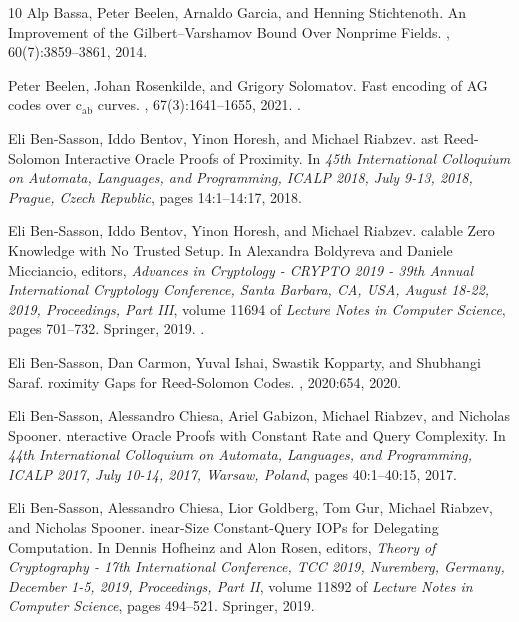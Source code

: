 \begin{thebibliography}{10}
Alp {Bassa}, Peter {Beelen}, Arnaldo {Garcia}, and Henning {Stichtenoth}.
\newblock An {I}mprovement of the {G}ilbert–{V}arshamov {B}ound {O}ver
  {N}onprime {F}ields.
,
  60(7):3859--3861, 2014.

Peter Beelen, Johan Rosenkilde, and Grigory Solomatov.
\newblock Fast encoding of {AG} codes over c\({}_{\mbox{ab}}\) curves.
, 67(3):1641--1655, 2021.
\newblock \href {https://doi.org/10.1109/TIT.2020.3042248}
  {}.

Eli Ben{-}Sasson, Iddo Bentov, Yinon Horesh, and Michael Riabzev.
ast {R}eed-{S}olomon {I}nteractive {O}racle {P}roofs of
  {P}roximity.
\newblock In {\em 45th International Colloquium on Automata, Languages, and
  Programming, {ICALP} 2018, July 9-13, 2018, Prague, Czech Republic}, pages
  14:1--14:17, 2018.

Eli Ben{-}Sasson, Iddo Bentov, Yinon Horesh, and Michael Riabzev.
calable {Z}ero {K}nowledge with {N}o {T}rusted {S}etup.
\newblock In Alexandra Boldyreva and Daniele Micciancio, editors, {\em Advances
  in Cryptology - {CRYPTO} 2019 - 39th Annual International Cryptology
  Conference, Santa Barbara, CA, USA, August 18-22, 2019, Proceedings, Part
  {III}}, volume 11694 of {\em Lecture Notes in Computer Science}, pages
  701--732. Springer, 2019.
\newblock \href {https://doi.org/10.1007/978-3-030-26954-8_23}
  {}.

Eli Ben{-}Sasson, Dan Carmon, Yuval Ishai, Swastik Kopparty, and Shubhangi
  Saraf.
roximity {G}aps for {R}eed-{S}olomon {C}odes.
, 2020:654, 2020.

Eli Ben{-}Sasson, Alessandro Chiesa, Ariel Gabizon, Michael Riabzev, and
  Nicholas Spooner.
nteractive {O}racle {P}roofs with {C}onstant {R}ate and {Q}uery
  {C}omplexity.
\newblock In {\em 44th International Colloquium on Automata, Languages, and
  Programming, {ICALP} 2017, July 10-14, 2017, Warsaw, Poland}, pages
  40:1--40:15, 2017.

Eli Ben{-}Sasson, Alessandro Chiesa, Lior Goldberg, Tom Gur, Michael Riabzev,
  and Nicholas Spooner.
inear-{S}ize {C}onstant-{Q}uery {I}{O}{P}s for {D}elegating
  {C}omputation.
\newblock In Dennis Hofheinz and Alon Rosen, editors, {\em Theory of
  Cryptography - 17th International Conference, {TCC} 2019, Nuremberg, Germany,
  December 1-5, 2019, Proceedings, Part {II}}, volume 11892 of {\em Lecture
  Notes in Computer Science}, pages 494--521. Springer, 2019.


\end{thebibliography}
